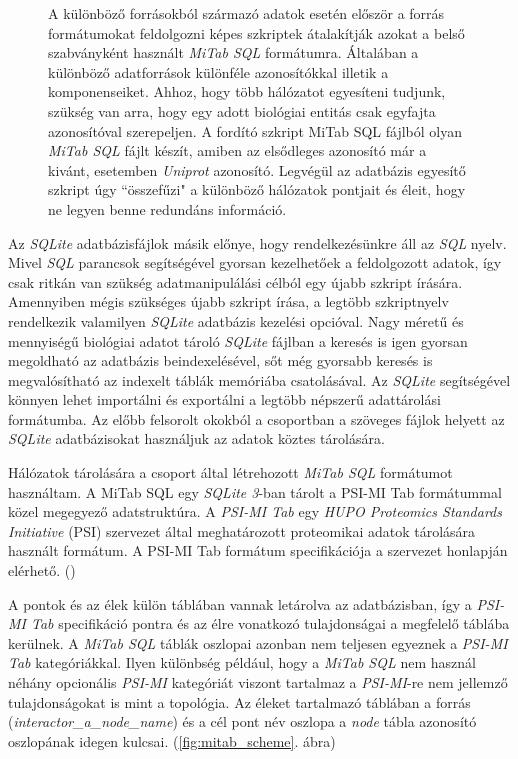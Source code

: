 \documentclass[a4paper,12pt]{article}
\newenvironment{imgdesc}{
		\small
		\singlespacing
		\begin{center}
		
	}{
		\end{center}	
	}
\begin{document}
\begin{figure}[H]
 			 		 \begin{imgdesc}
 				 		 A különböző forrásokból származó adatok esetén először a forrás formátumokat feldolgozni képes szkriptek átalakítják azokat a belső szabványként használt \textit{MiTab SQL} formátumra. Általában a különböző adatforrások különféle azonosítókkal illetik a komponenseiket. Ahhoz, hogy több hálózatot egyesíteni tudjunk, szükség van arra, hogy egy adott biológiai entitás csak egyfajta azonosítóval szerepeljen. A fordító szkript MiTab SQL fájlból olyan \textit{MiTab SQL} fájlt készít, amiben az elsődleges azonosító már a kivánt, esetemben \textit{Uniprot} azonosító. Legvégül az adatbázis egyesítő szkript úgy ``összefűzi" a különböző hálózatok pontjait és éleit, hogy ne legyen benne redundáns információ.
 			 		 \end{imgdesc}

			 		 \label{fig:slk3uml}			 		 
			 	 \end{figure}
			 	 



			
		 Az \textit{SQLite} adatbázisfájlok másik előnye, hogy rendelkezésünkre áll az \textit{SQL} nyelv. Mivel \textit{SQL} parancsok segítségével gyorsan kezelhetőek a feldolgozott adatok, így csak ritkán van szükség adatmanipulálási célból egy újabb szkript írására. Amennyiben mégis szükséges újabb szkript írása, a legtöbb szkriptnyelv rendelkezik valamilyen \textit{SQLite} adatbázis kezelési opcióval. Nagy méretű és mennyiségű biológiai adatot tároló \textit{SQLite} fájlban a keresés is igen gyorsan megoldható az adatbázis beindexelésével, sőt még gyorsabb keresés is megvalósítható az indexelt táblák memóriába csatolásával. Az \textit{SQLite} segítségével könnyen lehet importálni és exportálni a legtöbb népszerű adattárolási formátumba. Az előbb felsorolt okokból a csoportban a szöveges fájlok helyett az \textit{SQLite} adatbázisokat használjuk az adatok köztes tárolására. 
		
		Hálózatok tárolására a csoport által létrehozott \textit{MiTab SQL} formátumot használtam. A MiTab SQL egy \textit{SQLite 3}-ban tárolt a PSI-MI Tab formátummal közel megegyező adatstruktúra. A \textit{PSI-MI Tab} egy \textit{HUPO Proteomics Standards Initiative} (PSI) szervezet által meghatározott proteomikai adatok tárolására használt formátum. A PSI-MI Tab formátum specifikációja a szervezet honlapján elérhető. (\cite{hupo})
		
		A pontok és az élek külön táblában vannak letárolva az adatbázisban, így a \textit{PSI-MI Tab} specifikáció pontra és az élre vonatkozó tulajdonságai a megfelelő táblába kerülnek. A \textit{MiTab SQL} táblák oszlopai azonban nem teljesen egyeznek a \textit{PSI-MI Tab} kategóriákkal. Ilyen különbség például, hogy a \textit{MiTab SQL} nem használ néhány opcionális \textit{PSI-MI} kategóriát viszont tartalmaz a \textit{PSI-MI}-re nem jellemző tulajdonságokat is mint a topológia. Az éleket tartalmazó táblában a forrás (\textit{interactor\_a\_node\_name}) és a cél pont név oszlopa a \textit{node} tábla azonosító oszlopának idegen kulcsai. (\ref{fig:mitab_scheme}. ábra)
			
\end{document}
